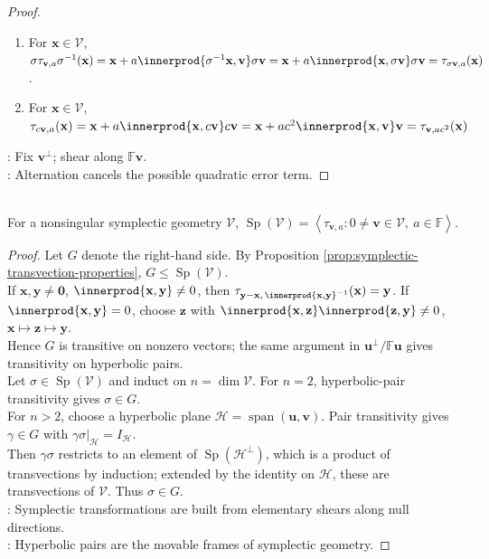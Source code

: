 \begin{proposition}
\begin{proof}
\begin{enumerate}[label=(\roman*)]
\item For $\mathbf{x}\in\mathcal{V}$, $\sigma\tau_{\mathbf{v},a}\sigma^{-1}(\mathbf{x}) =\mathbf{x}+a\innerprod{\sigma^{-1}\mathbf{x},\mathbf{v}}\sigma\mathbf{v} =\mathbf{x}+a\innerprod{\mathbf{x},\sigma\mathbf{v}}\sigma\mathbf{v} =\tau_{\sigma\mathbf{v},a}(\mathbf{x})$.
\item For $\mathbf{x}\in\mathcal{V}$, $\tau_{c\mathbf{v},a}(\mathbf{x}) =\mathbf{x}+a\innerprod{\mathbf{x},c\mathbf{v}}c\mathbf{v} =\mathbf{x}+ac^2\innerprod{\mathbf{x},\mathbf{v}}\mathbf{v} =\tau_{\mathbf{v},ac^2}(\mathbf{x})$
\end{enumerate}
: Fix $\mathbf{v}^{\perp}$; shear along $\mathbb{F}\mathbf{v}$.\\
: Alternation cancels the possible quadratic error term.
\end{proof}
\end{proposition}

\begin{theorem} \label{thm:symplectic-group-generated-by-transvections} \\
For a nonsingular symplectic geometry $\mathcal{V}$, $\operatorname{Sp}(\mathcal{V}) =\left\langle \tau_{\mathbf{v},a}:0\neq\mathbf{v}\in\mathcal{V},\ a\in\mathbb{F}\right\rangle$.
\begin{proof}
Let $G$ denote the right-hand side. By Proposition \ref{prop:symplectic-transvection-properties}, $G\leq\operatorname{Sp}(\mathcal{V})$.\\
If $\mathbf{x},\mathbf{y}\neq\mathbf{0}$, $\innerprod{\mathbf{x},\mathbf{y}}\neq0$, then $\tau_{\mathbf{y}-\mathbf{x},\,\innerprod{\mathbf{x},\mathbf{y}}^{-1}}(\mathbf{x})=\mathbf{y}$. If $\innerprod{\mathbf{x},\mathbf{y}}=0$, choose $\mathbf{z}$ with $\innerprod{\mathbf{x},\mathbf{z}}\innerprod{\mathbf{z},\mathbf{y}}\neq0$, $\mathbf{x}\mapsto\mathbf{z}\mapsto\mathbf{y}$.\\
Hence $G$ is transitive on nonzero vectors; the same argument in $\mathbf{u}^{\perp}/\mathbb{F}\mathbf{u}$ gives transitivity on hyperbolic pairs.\\
Let $\sigma\in\operatorname{Sp}(\mathcal{V})$ and induct on $n=\dim\mathcal{V}$. For $n=2$, hyperbolic-pair transitivity gives $\sigma\in G$.\\
For $n>2$, choose a hyperbolic plane $\mathcal{H}=\operatorname{span}(\mathbf{u},\mathbf{v})$. Pair transitivity gives $\gamma\in G$ with $\gamma\sigma|_{\mathcal{H}}=I_{\mathcal{H}}$.\\
Then $\gamma\sigma$ restricts to an element of $\operatorname{Sp}(\mathcal{H}^{\perp})$, which is a product of transvections by induction; extended by the identity on $\mathcal{H}$, these are transvections of $\mathcal{V}$. Thus $\sigma\in G$.\\
: Symplectic transformations are built from elementary shears along null directions.\\
: Hyperbolic pairs are the movable frames of symplectic geometry.
\end{proof}
\end{theorem}

